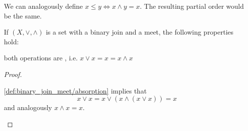 \begin{remark}\label{remark:binary_join_meet_order}
  We can analogously define \( x \leq y \iff x \land y = x \). The resulting partial order would be the same.
\end{remark}

\begin{proposition}\label{thm:binary_join_meet_properties}
  If \( (X, \lor, \land) \) is a set with a binary join and a meet, the following properties hold:
  \begin{defenum}
     both operations are , i.e. \( x \lor x = x = x \land x \)
  \end{defenum}
\end{proposition}
\begin{proof}
  \begin{description}
     \ref{def:binary_join_meet/absorption} implies that
    \begin{equation*}
      x \lor x = x \lor (x \land (x \lor x)) = x
    \end{equation*}
    and analogously \( x \land x = x \).
  \end{description}
\end{proof}

